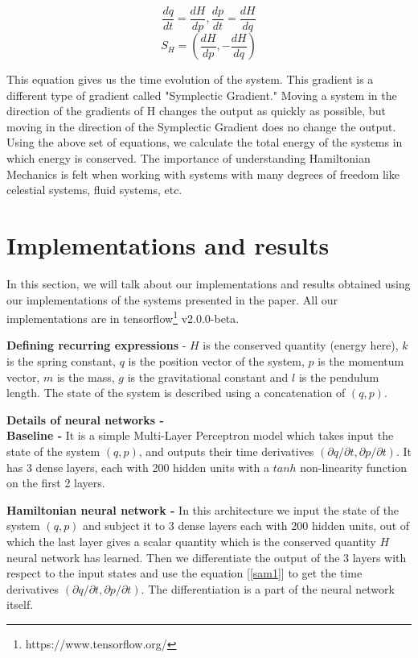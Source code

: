 \documentclass{article}
\begin{document}
\begin{equation}\label{sam1}
\frac{dq}{dt} = \frac{dH}{dp}, \frac{dp}{dt} = \frac{dH}{dq}
\end{equation}
\begin{equation}
S_H = \left( \frac{dH}{dp}, - \frac{dH}{dq}  \right)
\end{equation}

This equation gives us the time evolution of the system. This gradient is a different type of gradient called "Symplectic Gradient." Moving a system in the direction of the gradients of H changes the output as quickly as possible, but moving in the direction of the Symplectic Gradient does no change the output. Using the above set of equations, we calculate the total energy of the systems in which energy is conserved. The importance of understanding Hamiltonian Mechanics is felt when working with systems with many degrees of freedom like celestial systems, fluid systems, etc.  




\section{Implementations and results}
In this section, we will talk about our implementations and results obtained using our implementations of the systems presented in the paper. All our implementations are in tensorflow\footnote{https://www.tensorflow.org/} v2.0.0-beta.

\textbf{Defining recurring expressions} - \(H\) is the conserved quantity (energy here), \(k\) is the spring constant, \(q\) is the position vector of the system, \(p\) is the momentum vector, \(m\) is the mass, \(g\) is the gravitational constant and \(l\) is the pendulum length. The state of the system is described using a concatenation of \((q, p)\).

\textbf{Details of neural networks -}\\
\textbf{Baseline - } It is a simple Multi-Layer Perceptron model which takes input the state of the system \((q, p)\), and outputs their time derivatives \((\partial q/\partial t, \partial p/\partial t)\). It has 3 dense layers, each with 200 hidden units with a \(tanh\) non-linearity function on the first 2 layers.

\textbf{Hamiltonian neural network - } In this architecture we input the state of the system \((q, p)\) and subject it to 3 dense layers each with 200 hidden units, out of which the last layer gives a scalar quantity which is the conserved quantity \(H\) neural network has learned. Then we differentiate the output of the 3 layers with respect to the input states and use the equation [\ref{sam1}] to get the time derivatives \((\partial q/\partial t, \partial p/\partial t)\). The differentiation is a part of the neural network itself.
\end{document}
